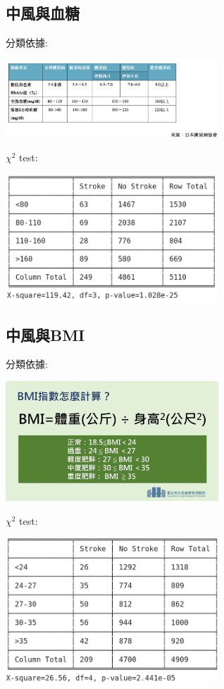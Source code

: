 \subsection{中風與血糖}
分類依據:
\begin{center}
    \includegraphics[width=8cm]{./images/glucose_category_ref.png}
\end{center}
$\chi^2$ test:
\begin{center}
    \includegraphics[width=8cm]{./chisquare/glucose_stroke.png}
\end{center}

\subsection{中風與BMI}
分類依據:
\begin{center}
    \includegraphics[width=8cm]{./images/bmi_category_ref.jpg}
\end{center}
$\chi^2$ test:
\begin{center}
    \includegraphics[width=8cm]{./chisquare/bmi_stroke.png}
\end{center}

